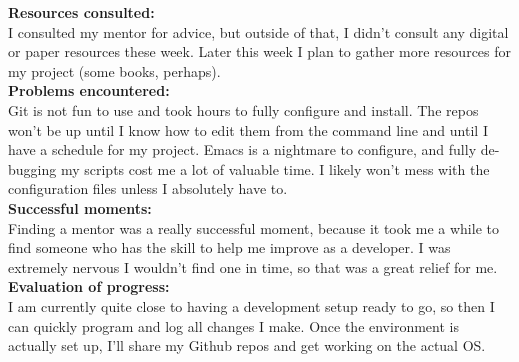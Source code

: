 \documentclass[11pt]{article}
\begin{document}
\textbf{Resources consulted:}\\
I consulted my mentor for advice, but outside of that, I didn't consult any digital or paper resources these week. Later this week I plan to gather more resources for my project (some books, perhaps).\\
\textbf{Problems encountered:}\\
Git is not fun to use and took hours to fully configure and install. The repos won't be up until I know how to edit them from the command line and until I have a schedule for my project. 
Emacs is a nightmare to configure, and fully de-bugging my scripts cost me a lot of valuable time. I likely won't mess with the configuration files unless I absolutely have to.\\
\textbf{Successful moments:}\\
Finding a mentor was a really successful moment, because it took me a while to find someone who has the skill to help me improve as a developer. I was extremely nervous I wouldn't find one in time, so that was a great relief for me.\\
\textbf{Evaluation of progress:}\\
I am currently quite close to having a development setup ready to go, so then I can quickly program and log all changes I make. Once the environment is actually set up, I'll share my Github repos and get working on the actual OS.
\end{document}
